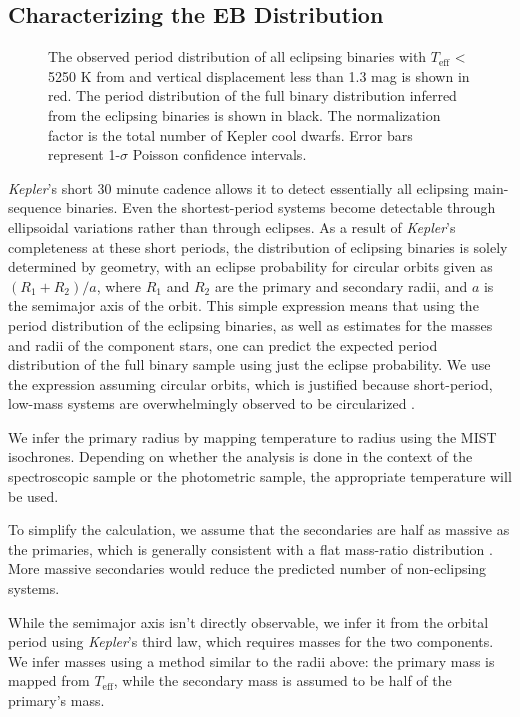 \documentclass[twocolumn]{aastex6}
\newcommand{\Kepler}{\mbox{\textit{Kepler}}}
\newcommand{\Teff}{\ensuremath{T_{\textrm{eff}}}}
\begin{document}
\subsection{Characterizing the EB Distribution}
\label{sec:ebmodel}

\begin{figure}[htb]
    \centering
    \caption{The observed period distribution of all eclipsing binaries with
    \Teff{} < 5250 K from \citet{Pinsonneault12} and vertical displacement less
than 1.3 mag is shown in red. The period distribution of the full binary
distribution inferred from the eclipsing binaries is shown in black. The
normalization factor is the total number of Kepler cool dwarfs. Error bars
represent 1-\(\sigma\) Poisson confidence intervals.}\label{fig:ebdist}
\end{figure}

\Kepler{}'s short 30 minute cadence allows it to detect essentially all eclipsing
main-sequence binaries. Even the shortest-period systems become detectable
through ellipsoidal variations rather than through eclipses. As a result of
\Kepler{}'s completeness at these short periods, the distribution of eclipsing
binaries is solely determined by geometry, with an eclipse probability for circular 
orbits given as \((R_1 + R_2)/a\), where \(R_1\) and \(R_2\) are the primary 
and secondary radii, and \(a\) is the semimajor axis of the orbit. This simple
expression means that using the period distribution of the eclipsing binaries, 
as well as estimates for the masses and radii of the component stars, one can
predict the expected period distribution of the full binary sample using just 
the eclipse probability. We use the expression assuming circular orbits, which 
is justified because short-period, low-mass systems are overwhelmingly observed 
to be circularized \citep{Raghavan10,VanEylen16}. 

We infer the primary radius by mapping temperature to radius using the MIST
isochrones. Depending on whether the analysis is done in the context of the
spectroscopic sample or the photometric sample, the appropriate temperature
will be used.

To simplify the calculation, we assume that the secondaries are half as massive 
as the primaries, which is generally consistent with a flat mass-ratio 
distribution \citep{Raghavan10}. More massive secondaries would reduce the 
predicted number of non-eclipsing systems. 

While the semimajor axis isn't directly observable, we infer it from the 
orbital period using \Kepler{}'s third law, which requires masses for the two
components. We infer masses using a method similar to the radii above: the
primary mass is mapped from \Teff{}, while the secondary mass is assumed to be
half of the primary's mass.
\end{document}
